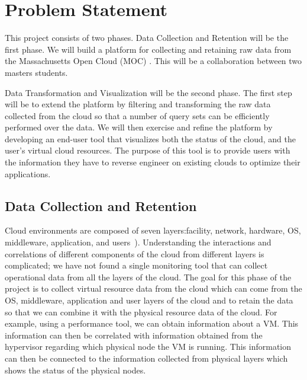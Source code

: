 \section{Problem Statement}
\label{sec:ProblemStatement}

%

This project consists of two phases. Data Collection and Retention will be the first phase. We will build a platform for collecting and retaining raw data from the Massachusetts Open Cloud (MOC) . This will be a collaboration between two masters students.  

Data Transformation and Visualization will be the second phase. The first step will be to extend the platform by filtering and transforming the raw data collected from the cloud so that a number of query sets can be efficiently performed over the data. We will then exercise and refine the platform by developing an end-user tool that visualizes both the status of the cloud, and the user’s virtual cloud resources. The purpose of this tool is to provide users with the information they have to reverse engineer on existing clouds to optimize their applications.


\subsection{Data Collection and Retention}

Cloud environments are composed of seven layers:facility, network, hardware, OS, middleware, application, and users~\cite{spring2011monitoring}). Understanding the interactions and correlations of different components of the cloud from different layers is complicated; we have not found a single monitoring tool that can collect operational data from all the layers of the cloud. The goal for this phase of the project is to collect virtual resource data from the cloud which can come from the OS, middleware, application and user layers of the cloud and to retain the data so that we can combine it with the physical resource data of the cloud. For example, using a performance tool, we can obtain information about a VM. This information can then be correlated with information obtained from the hypervisor regarding which physical node the VM is running.  This information can then be connected to the information collected from physical layers which shows the status of the physical nodes. 

